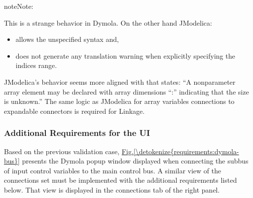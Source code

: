 \documentclass[letterpaper,10pt, openany,english]{sphinxmanual}
\begin{document}
\begin{sphinxadmonition}{note}{Note:}
\begin{sphinxVerbatim}[commandchars=\\\{\}]
 \PYG{p}{[}\PYG{p}{]}

  
\PYG{p}{[}\PYG{p}{]}  
\PYG{p}{[}\PYG{p}{]}  
\PYG{p}{[}\PYG{p}{]} 
\PYG{p}{[}\PYG{p}{]} 
\end{sphinxVerbatim}

This is a strange behavior in Dymola. On the other hand JModelica:
\begin{itemize}
\item {} 
allows the unspecified \sphinxcode{\sphinxupquote{{[}:{]}}} syntax and,

\item {} 
does not generate any translation warning when explicitly specifying the indices range.

\end{itemize}

JModelica’s behavior seems more aligned with   that states: “A non\sphinxhyphen{}parameter array element may be declared with array dimensions “:” indicating that the size is unknown.”
The same logic as JModelica for array variables connections to expandable connectors is required for Linkage.
\end{sphinxadmonition}


\subsubsection{Additional Requirements for the UI}
\label{\detokenize{requirements:additional-requirements-for-the-ui}}\label{\detokenize{requirements:sec-connect-ui-req}}
Based on the previous validation case, \hyperref[\detokenize{requirements:dymola-bus}]{Fig.\@ \ref{\detokenize{requirements:dymola-bus}}} presents the Dymola pop\sphinxhyphen{}up window displayed when connecting the sub\sphinxhyphen{}bus of input control variables to the main control bus.
A similar view of the connections set must be implemented with the additional requirements listed below. That view is displayed in the connections tab of the right panel.
\end{document}
